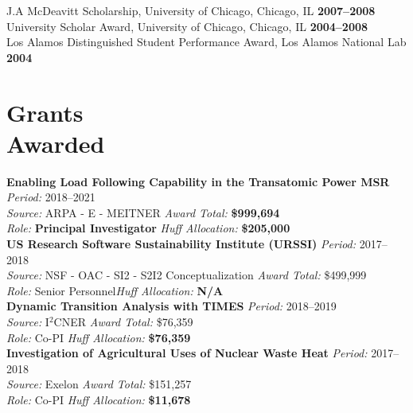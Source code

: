 \documentclass[margin,line]{resume}
\begin{document}
\begin{resume}
                J.A  McDeavitt Scholarship, University of Chicago, Chicago, IL                 \hfill\textbf{2007--2008}\vspace{.5mm}\\%
                University Scholar Award, University of Chicago, Chicago, IL                   \hfill\textbf{2004--2008}\vspace{.5mm}\\%
                Los Alamos Distinguished Student Performance Award, Los Alamos National Lab                         \hfill\textbf{2004}%
    \section{\mysidestyle Grants\\Awarded}
    \textbf{Enabling Load Following Capability in the Transatomic Power MSR} \hfill \textsl{Period:}
    2018--2021\\
    \textsl{Source:} ARPA - E - MEITNER \hfill \textsl{Award Total:} \textbf{\$999,694}\\
    \textsl{Role:} \textbf{Principal Investigator} \hfill \textsl{Huff Allocation:} \textbf{\$205,000}\vspace{2mm}\\%
    \textbf{US Research Software Sustainability Institute (URSSI)} \hfill \textsl{Period:}
    2017--2018\\
    \textsl{Source:} NSF - OAC - SI2 - S2I2 Conceptualization \hfill \textsl{Award Total:} \$499,999\\
    \textsl{Role:} Senior Personnel\hfill \textsl{Huff Allocation:} \textbf{N/A}\vspace{2mm}\\%
    \textbf{Dynamic Transition Analysis with TIMES} \hfill \textsl{Period:}
    2018--2019\\
    \textsl{Source:} I$^2$CNER \hfill \textsl{Award Total:} \$76,359\\
    \textsl{Role:} Co-PI \hfill \textsl{Huff Allocation:} \textbf{\$76,359}\vspace{2mm}\\%
    \textbf{Investigation of Agricultural Uses of Nuclear Waste Heat} \hfill \textsl{Period:} 2017--2018\\
    \textsl{Source:} Exelon \hfill \textsl{Award Total:} \$151,257\\
    \textsl{Role:} Co-PI \hfill \textsl{Huff Allocation:} \textbf{\$11,678}\vspace{2mm}\\%

\end{resume}
\end{document}
